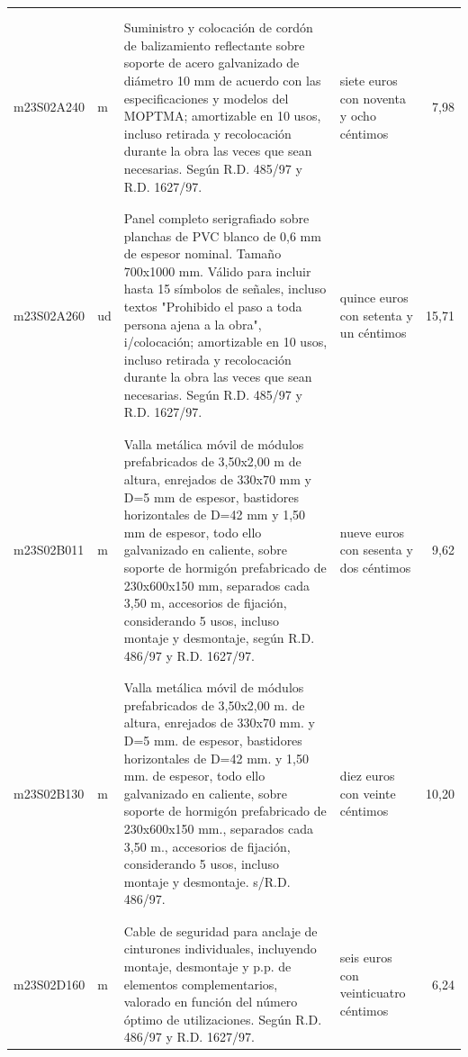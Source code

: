 \begin{supertabular}{|l|l|p{5cm}|p{3cm}|r|}
&&&&\\%
&&&&\\%
m23S02A240&m&Suministro y colocación de cordón de balizamiento reflectante sobre soporte de acero galvanizado de diámetro 10 mm de acuerdo con las especificaciones y modelos del MOPTMA; amortizable en 10 usos, incluso retirada y recolocación durante la obra las veces que sean necesarias. Según R.D. 485/97 y R.D. 1627/97.&siete euros con noventa y ocho céntimos&7,98\\%
&&&&\\%
&&&&\\%
m23S02A260&ud&Panel completo serigrafiado sobre planchas de PVC blanco de 0,6 mm de espesor nominal. Tamaño 700x1000 mm. Válido para incluir hasta 15 símbolos de señales, incluso textos "Prohibido el paso a toda persona ajena a la obra", i/colocación; amortizable en 10 usos, incluso retirada y recolocación durante la obra las veces que sean necesarias. Según R.D. 485/97 y R.D. 1627/97.&quince euros con setenta y un céntimos&15,71\\%
&&&&\\%
&&&&\\%
m23S02B011&m&Valla metálica móvil de módulos prefabricados de 3,50x2,00 m de altura, enrejados de 330x70 mm y D=5 mm de espesor, bastidores horizontales de D=42 mm y 1,50 mm de espesor, todo ello galvanizado en caliente, sobre soporte de hormigón prefabricado de 230x600x150 mm, separados cada 3,50 m, accesorios de fijación, considerando 5 usos, incluso montaje y desmontaje, según R.D. 486/97 y R.D. 1627/97.&nueve euros con sesenta y dos céntimos&9,62\\%
&&&&\\%
&&&&\\%
m23S02B130&m&Valla metálica móvil de módulos prefabricados de 3,50x2,00 m. de altura, enrejados de 330x70 mm. y D=5 mm. de espesor, bastidores horizontales de D=42 mm. y 1,50 mm. de espesor, todo ello galvanizado en caliente, sobre soporte de hormigón prefabricado de 230x600x150 mm., separados cada 3,50 m., accesorios de fijación, considerando 5 usos, incluso montaje y desmontaje. s/R.D. 486/97.&diez euros con veinte céntimos&10,20\\%
&&&&\\%
&&&&\\%
m23S02D160&m&Cable de seguridad para anclaje de cinturones individuales, incluyendo montaje, desmontaje y p.p. de elementos complementarios, valorado en función del número óptimo de utilizaciones. Según R.D. 486/97 y R.D. 1627/97.&seis euros con veinticuatro céntimos&6,24\\%

\end{supertabular}
